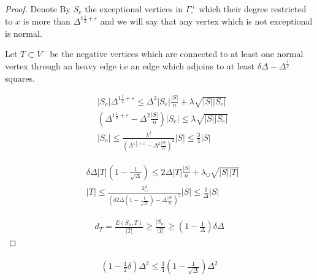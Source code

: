 \begin{proof}
Denote By $S_{e}$ the exceptional vertices in $\Gamma^{+}_{\square}$ which their degree restricted to $x$ is more than $\Delta^{1 \frac{1}{2} + \varepsilon}$ and we will say that any vertex which is not exceptional is normal.  

Let $T \subset V^{-}$ be the negative vertices which are connected to at least one normal vertex through an heavy edge i.e an edge which adjoins to at least $\delta\Delta - \Delta^{\frac{1}{2}}$ squares. 


\begin{equation*}
  \begin{split}
    & |S_{e}|\Delta^{1 \frac{1}{2}+ \varepsilon} \le \Delta^{2}|S_{e}|\frac{|S|}{n} +  \lambda \sqrt{|S||S_{e}|} \\ 
    & \left(  \Delta^{1 \frac{1}{2}+ \varepsilon} - \Delta^{2} \frac{|S|}{n}\right)|S_{e}| \le  \lambda \sqrt{|S||S_{e}|}\\
    & |S_{e}| \le \frac{\lambda^{2}}{\left(  \Delta^{1 \frac{1}{2}+ \varepsilon} - \Delta^{2} \frac{|S|}{n} \right)^{2}} |S| \le \frac{3}{4} |S|
  \end{split}
\end{equation*}


\begin{equation*}
  \begin{split}
    & \delta\Delta|T|\left( 1 - \frac{1}{\sqrt{\Delta}} \right) \le 2\Delta |T| \frac{|S|}{n} + \lambda_{\cup} \sqrt{|S||T|}\\ 
    & |T| \le \frac{\lambda_{\cup}^{2}}{ \left( \delta 2\Delta \left( 1 - \frac{1}{\sqrt{\Delta}} \right) -  \Delta \frac{|S|}{n} \right)^{2} } |S| \le \frac{1}{\Delta}|S|
  \end{split}
\end{equation*}


\begin{equation*}
  \begin{split}
    d_{T} = \frac{E(S_{n}, T)}{|T|} \ge \frac{|S_{n|}}{|T|} \ge   \left( 1 -  \frac{1}{\Delta} \right) \delta \Delta
  \end{split}
\end{equation*}

\end{proof}

\begin{equation*}
  \begin{split}
    (1- \frac{1}{2}\delta)\Delta^{2} \le \frac{3}{4}\left( 1 - \frac{1}{\sqrt{\Delta}}  \right)\Delta^{2} 
  \end{split}
\end{equation*}

